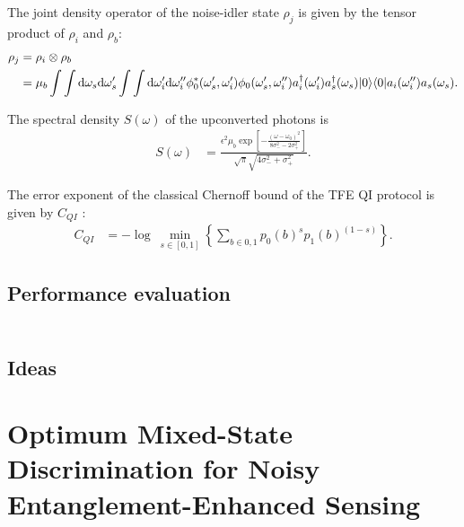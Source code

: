 \documentclass[../../note.tex]{subfiles}
\begin{document}
\begin{lemma}
    The joint density operator of the noise-idler state $\rho_j$ is given by the tensor product of $\rho_i$ and $\rho_b$:
    \begin{align}
        \rho_j 
        &= \rho_i \otimes \rho_b \\
        &= \mu_b \int \int {\rm d}\omega_s{\rm d}\omega_s' \int \int {\rm d}\omega_i'{\rm d}\omega_i''\phi_0^\ast(\omega_s', \omega_i') \phi_0(\omega_s', \omega_i'') a_i^\dagger(\omega_i') a_s^\dagger(\omega_s)\vert 0 \rangle \langle 0 \vert a_i(\omega_i'')a_s(\omega_s).
    \end{align}
\end{lemma}

\begin{lemma}
    The spectral density $S(\omega)$ of the upconverted photons is
    \begin{align}
        S(\omega)
        &= \frac{\epsilon^2 \mu_b \exp\left[-\frac{(\omega - \omega_0)^2}{8 \sigma_-^2 - 2 \sigma_+^2}\right]}{\sqrt{\pi} \sqrt{4 \sigma_-^2 + \sigma_+^2}}.
    \end{align}
\end{lemma}

\begin{theorem}
    The error exponent of the classical Chernoff bound of the TFE QI protocol is given by $C_{QI}$ \cite{nussbaum2009chernoff}:
    \begin{align}
        C_{QI}
        &= -\log~\min_{s \in [0,1]} \left\{\sum_{b \in 0,1}p_0(b)^s p_1(b)^{(1-s)}\right\}.
    \end{align}
\end{theorem}

\subsection{Performance evaluation}

\begin{lemma}
    \begin{align}
    \end{align}
\end{lemma}

\subsection{Ideas}

\section{Optimum Mixed-State Discrimination for Noisy Entanglement-Enhanced Sensing \cite{zhuang2017optimum}}
\end{document}
